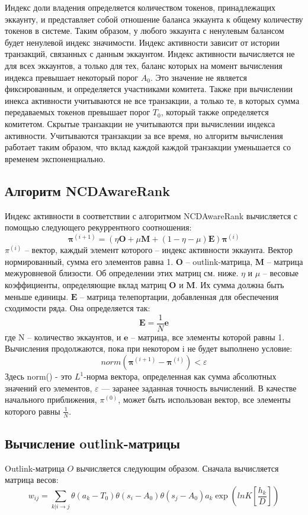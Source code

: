 \documentclass[a4paper,12pt]{article}
\begin{document}
Индекс доли владения определяется количеством токенов, принадлежащих эккаунту, и представляет собой отношение баланса эккаунта к общему количеству токенов в системе. Таким образом, у любого эккаунта с ненулевым балансом будет ненулевой индекс значимости. Индекс активности зависит от истории транзакций, связанных с данным эккаунтом. Индекс активности вычисляется не для всех эккаунтов, а только для тех, баланс которых на момент вычисления индекса превышает некоторый порог $A_0$. Это значение не является фиксированным, и определяется участниками комитета. Также при вычислении инекса активности учитываются не все транзакции, а только те, в которых сумма передаваемых токенов превышает порог $T_0$, который также определяется комитетом. Скрытые транзакции не учитываются при вычислении индекса активности. Учитываются транзакции за все время, но алгоритм вычисления работает таким образом, что вклад каждой каждой транзакции уменьшается со временем экспоненциально.

\subsection{Алгоритм NCDAwareRank}
Индекс активности в соответствии с алгоритмом NCDAwareRank вычисляется с помощью следующего рекуррентного соотношения:
$$
\boldsymbol{\pi}^{(i+1)} = ( \eta \boldsymbol{O} + \mu \boldsymbol{M} + ( 1 - \eta - \mu ) \boldsymbol{E} ) \boldsymbol{\pi}^{(i)}
$$
$\pi^{(i)}$ -- вектор, каждый элемент которого -- индекс активности эккаунта. Вектор нормированный, сумма его элементов равна 1.
$\boldsymbol{O}$ -- outlink-матрица, $\boldsymbol{M}$ – матрица межуровневой близости. Об определении этих матриц см. ниже.
$\eta$ и $\mu$ – весовые коэффициенты, определяющие вклад матриц $\boldsymbol{O}$ и $\boldsymbol{M}$. Их сумма должна быть меньше единицы.
$\boldsymbol{E}$ -- матрица телепортации, добавленная для обеспечения сходимости ряда. Она определяется так:
$$
\boldsymbol{E}=\frac{1}{N}\boldsymbol{e}
$$
где N -- количество эккаунтов, и $\boldsymbol{e}$ -- матрица, все элементы которой равны 1.
Вычисления продолжаются, пока при некотором i не будет выполнено условие:
$$
norm(\boldsymbol{\pi}^{(i+1)}-\boldsymbol{\pi}^{(i)})<\varepsilon
$$
Здесь norm() - это $L^1$-норма вектора, определенная как сумма абсолютных значений его элементов, $\varepsilon$ — заранее заданная точность вычислений. 
В качестве начального приближения, $\pi^{(0)}$, может быть использован вектор, все элементы которого равны $\frac{1}{N}$.

\subsection{Вычисление outlink-матрицы}
Outlink-матрица $O$ вычисляется следующим образом. Сначала вычисляется матрица весов:
$$
w_{ij}=\sum_{k|i \to j} \theta ( a_k - T_0 ) \theta ( s_i - A_0 ) \theta ( s_j - A_0 ) a_k \exp{(lnK [\frac{h_k}{D}])}
$$
\end{document}
